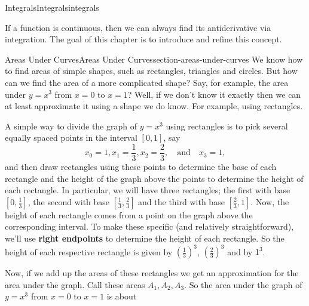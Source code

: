 \documentclass[oneside,10pt,]{book}
\newcommand{\terminology}[1]{\textbf{#1}}
\numberwithin{equation}{section}
\begin{document}
%
%
\typeout{************************************************}
\typeout{************************************************}
%
\begin{chapterptx}{Integrals}{}{Integrals}{}{}{integrals}
\begin{introduction}{}%
\hypertarget{p-401}{}%
If a function is continuous, then we can always find its antiderivative via integration. The goal of this chapter is to introduce and refine this concept.%
\end{introduction}%
%
%
\typeout{************************************************}
\typeout{************************************************}
%
\begin{sectionptx}{Areas Under Curves}{}{Areas Under Curves}{}{}{section-areas-under-curves}
\hypertarget{p-402}{}%
We know how to find areas of simple shapes, such as rectangles, triangles and circles. But how can we find the area of a more complicated shape? Say, for example, the area under \(y=x^{3}\) from \(x=0\) to \(x=1\)? Well, if we don't know it exactly then we can at least approximate it using a shape we do know. For example, using rectangles.%
\par
\hypertarget{p-403}{}%
A simple way to divide the graph of \(y=x^{3}\) using rectangles is to pick several equally spaced points in the interval \([0,1]\), say%
\begin{equation*}
x_{0} = 1, x_{1} = \frac{1}{3}, x_{2} = \frac{2}{3}, \quad\text{and}\quad x_{3} = 1,
\end{equation*}
and then draw rectangles using these points to determine the base of each rectangle and the height of the graph above the points to determine the height of each rectangle. In particular, we will have three rectangles; the first with base \([0,\frac{1}{3}]\), the second with base \([\frac{1}{3},\frac{2}{3}]\) and the third with base \([\frac{2}{3},1]\). Now, the height of each rectangle comes from a point on the graph above the corresponding interval. To make these specific (and relatively straightforward), we'll use \terminology{right endpoints} to determine the height of each rectangle. So the height of each respective rectangle is given by \((\frac{1}{3})^{3}\), \((\frac{2}{3})^{3}\) and by \(1^{3}\).%
\par
\hypertarget{p-404}{}%
Now, if we add up the areas of these rectangles we get an approximation for the area under the graph. Call these areas \(A_{1},A_{2},A_{3}\). So the area under the graph of \(y = x^{3}\) from \(x=0\) to \(x=1\) is about%

\end{sectionptx}
\end{chapterptx}
\end{document}
